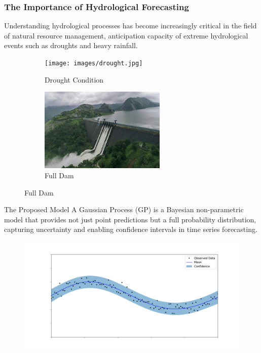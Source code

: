 \documentclass[10pt, xcolor=table]{beamer}
\begin{document}
\begin{frame}
	\frametitle{The Importance of Hydrological Forecasting}
	
	Understanding hydrological processes has become increasingly critical in the field of natural resource management, anticipation capacity of extreme hydrological events such as droughts and heavy rainfall.
	
	\begin{figure}
		\centering
		\begin{subfigure}[b]{0.45\textwidth}
			\centering
			\texttt{[image: images/drought.jpg]}
			\caption{Drought Condition}
		\end{subfigure}
		\hfill
		\begin{subfigure}[b]{0.45\textwidth}
			\centering
			\includegraphics[width=\textwidth, height=4cm]{images/full_dam.jpg}
			\caption{Full Dam}
		\end{subfigure}
	\end{figure}
	
\end{frame}

\begin{frame}{The Proposed Model}
	A Gaussian Process (GP) is a Bayesian non-parametric model that provides not just point predictions but a full probability distribution, capturing uncertainty and enabling confidence intervals in time series forecasting.
	
	\begin{figure}
		\centering
		\includegraphics[width=\textwidth]{images/gpr.png}
	\end{figure}
\end{frame}
\end{document}
